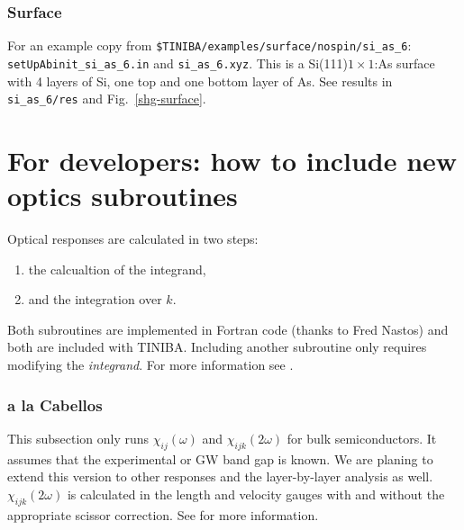 \documentclass[openany,oneside]{book}
\numberwithin{equation}{section}
\begin{document}
\subsection{Surface} 
For an example copy from \verb=$TINIBA/examples/surface/nospin/si_as_6=:\\
\verb=setUpAbinit_si_as_6.in= and \verb=si_as_6.xyz=. This is a
Si(111)$1\times 1$:As surface with 4 layers of Si, one top and one bottom
layer of As. See results in \verb=si_as_6/res= and Fig.~\ref{shg-surface}.


\chapter{For developers: how to include new optics subroutines}
Optical responses are calculated in two steps:

\begin{enumerate}
\item the calcualtion of the integrand,
\item and the integration over $k$.
\end{enumerate}

Both subroutines are implemented in Fortran code (thanks to Fred Nastos) and both are included with TINIBA. Including another subroutine only requires modifying the \emph{integrand}. For more information see \cite{sipe_second-order_2000}.

\subsection{a la Cabellos}

This subsection only runs $\chi_{ij}(\omega)$ and $\chi_{ijk}(2\omega)$ for bulk semiconductors. It assumes that the experimental or GW band gap is known. We are planing to extend this version to other responses and the layer-by-layer analysis as well. $\chi_{ijk}(2\omega)$ is calculated in the length and velocity gauges with and without the appropriate scissor correction. See \cite{cabellos_effects_2009} for more information.
\end{document}
